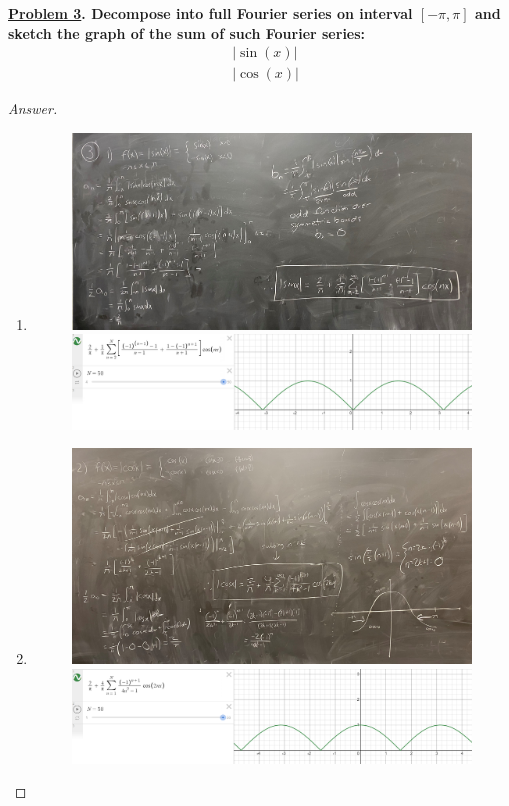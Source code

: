 \documentclass{article}
\theoremstyle{definition}
\renewcommand\qedsymbol{$\blacksquare$}
\newenvironment{ans}{\begin{proof}[Answer]\renewcommand{\qedsymbol}{}}{\end{proof}}
\newenvironment{boldenv}{\bfseries\boldmath}{}
\begin{document}
\begin{boldenv}
    \underline{Problem 3}. Decompose into full Fourier series on interval $[-\pi, \pi]$ and sketch the graph of the sum of such Fourier series: \begin{align}
        & |\sin(x)|\\
        & |\cos(x)|
    \end{align}
\end{boldenv}
\newpage
\begin{ans}
    \begin{enumerate}
        \item \phantom{.}
        \begin{figure}[H]
            \centering
            \includegraphics[width = .8\textwidth]{Problem 3-1.png}
            \includegraphics[width = .8\textwidth]{Problem 3.1.png}
        \end{figure}

        \item \phantom{.}
        \begin{figure}[H]
            \centering
            \includegraphics[width = .8\textwidth]{Problem 3-2.png}
            \includegraphics[width = .8\textwidth]{Problem 3.2.png}
        \end{figure}
    \end{enumerate}
\end{ans}
\end{document}
